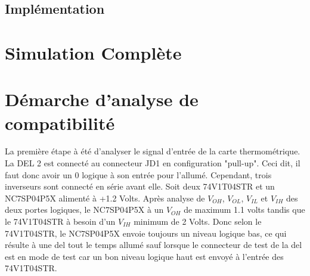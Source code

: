 \documentclass[a11paper]{article}
\begin{document}
\subsection{Implémentation}

\section{Simulation Complète}

\section{Démarche d'analyse de compatibilité}
La première étape à été d'analyser le signal d'entrée de la carte thermométrique. La DEL 2 est connecté au connecteur JD1 en
configuration "pull-up". Ceci dit, il faut donc avoir un 0 logique à son entrée pour l'allumé. Cependant, trois inverseurs sont
connecté en série avant elle. Soit deux 74V1T04STR et un NC7SP04P5X alimenté à +1.2 Volts. Après analyse de $V_{OH}$, $V_{OL}$, $V_{IL}$
et $V_{IH}$ des deux portes logiques, le NC7SP04P5X à un $V_{OH}$ de maximum 1.1 volts tandis que le 74V1T04STR à besoin d'un $V_{IH}$
minimum de 2 Volts. Donc selon le 74V1T04STR, le NC7SP04P5X envoie toujours un niveau logique bas, ce qui résulte à une del
tout le temps allumé sauf lorsque le connecteur de test de la del est en mode de test car un bon niveau logique haut est envoyé à
l'entrée des 74V1T04STR.


\end{document}
